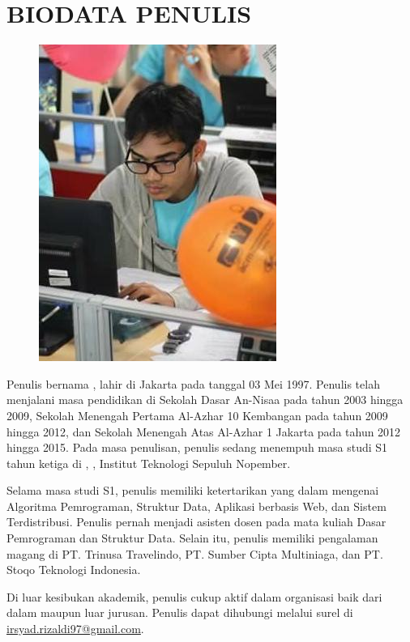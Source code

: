 
\chapter{BIODATA PENULIS}

\begin{figure}
	\includegraphics[height=0.25\textheight]{figures/cad.jpg}
\end{figure}

Penulis bernama \penulis, lahir di Jakarta pada tanggal 03 Mei 1997. Penulis telah menjalani masa pendidikan di Sekolah Dasar An-Nisaa pada tahun 2003 hingga 2009, Sekolah Menengah Pertama Al-Azhar 10 Kembangan pada tahun 2009 hingga 2012, dan Sekolah Menengah Atas Al-Azhar 1 Jakarta pada tahun 2012 hingga 2015. Pada masa penulisan, penulis sedang menempuh masa studi S1 tahun ketiga di \jurusan, \fakultas, Institut Teknologi Sepuluh Nopember.

Selama masa studi S1, penulis memiliki ketertarikan yang dalam mengenai Algoritma Pemrograman, Struktur Data, Aplikasi berbasis Web, dan Sistem Terdistribusi. Penulis pernah menjadi asisten dosen pada mata kuliah Dasar Pemrograman dan Struktur Data.
Selain itu, penulis memiliki pengalaman magang di PT. Trinusa Travelindo, PT. Sumber Cipta Multiniaga,
dan PT. Stoqo Teknologi Indonesia.

Di luar kesibukan akademik, penulis cukup aktif dalam organisasi baik dari dalam maupun luar jurusan.
Penulis dapat dihubungi melalui surel di \href{mailto:irsyad.rizaldi97@gmail.com}{irsyad.rizaldi97@gmail.com}.